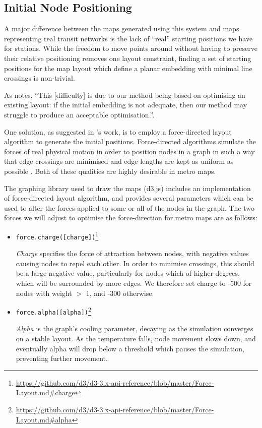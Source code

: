 \subsection{Initial Node Positioning}

A major difference between the maps generated using this system and maps representing real transit networks is the lack of ``real'' starting positions we have for stations. While the freedom to move points around without having to preserve their relative positioning removes one layout constraint, finding a set of starting positions for the map layout which define a planar embedding with minimal line crossings is non-trivial. 

As \citeauthor{AutomaticMetroMapLayoutThesis} notes, ``This [difficulty] is due to our method being based on optimising an existing layout: if the initial embedding is not adequate, then our method may struggle to produce an acceptable optimisation.''\cite[p.210]{AutomaticMetroMapLayoutThesis}.

One solution, as suggested in \citeauthor{AutomaticMetroMapLayoutThesis}'s work, is to employ a force-directed layout algorithm to generate the initial positions. Force-directed algorithms simulate the forces of real physical motion in order to position nodes in a graph in such a way that edge crossings are minimised and edge lengths are kept as uniform as possible \citep{springembedders}. Both of these qualities are highly desirable in metro maps.

The graphing library used to draw the maps (d3.js) includes an implementation of  force-directed layout algorithm, and provides several parameters which can be used to alter the forces applied to some or all of the nodes in the graph. The two forces we will adjust to optimise the force-direction for metro maps are as follows:

\begin{itemize}
\item\texttt{force.charge([charge])}\footnote{\url{https://github.com/d3/d3-3.x-api-reference/blob/master/Force-Layout.md\#charge}}\par
	\textit{Charge} specifies the force of attraction between nodes, with negative values causing nodes to repel each other. In order to minimise crossings, this should be a large negative value, particularly for nodes which of higher degrees, which will be surrounded by more edges. We therefore set charge to -500 for nodes with weight $>$ 1, and -300 otherwise. 

\item\texttt{force.alpha([alpha])}\footnote{\url{https://github.com/d3/d3-3.x-api-reference/blob/master/Force-Layout.md\#alpha}}\par
	\textit{Alpha} is the graph's cooling parameter, decaying as the simulation converges on a stable layout. As the temperature falls, node movement slows down, and eventually alpha will drop below a threshold which pauses the simulation, preventing further movement. 
\end{itemize}

